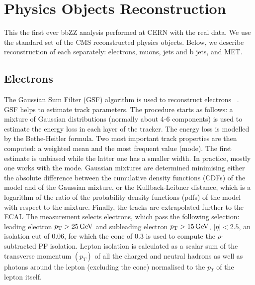 \chapter{Physics Objects Reconstruction}
\label{ch:objects}


This the first ever bbZZ analysis performed at CERN with the real data. We use the standard set of the CMS
reconstructed physics objects. Below, we describe reconstruction of
each separately: electrons, muons, jets and b jets, and MET.



\section{Electrons\label{sec:electrons}}
The Gaussian Sum Filter (GSF) algorithm is used to reconstruct
electrons ~\cite{Khachatryan:2015hwa}. GSF helps to estimate track parameters. The procedure starts as follows: a mixture of Gaussian distributions (normally about 4-6 components) \cite{GSF} is used to estimate the energy loss in each layer of the tracker. The energy loss is modelled by the Bethe-Heitler formula. Two most important track properties are then computed: a weighted mean and the most frequent value (mode). The first estimate is unbiased while the latter one has a smaller width. In practice, mostly one works with the mode. Gaussian mixtures are determined minimising either the absolute difference between the cumulative density functions (CDFs) of the model and of the Gaussian mixture, or the Kullback-Leibner distance, which is a logarithm of the ratio of the probability density functions (pdfs) of the model with respect to the mixture. Finally, the tracks are extrapolated further to the ECAL The measurement selects electrons, which pass the following selection: leading electron $p_{\mathrm{T}}>25\,\text{Ge\hspace{-.08em}V}$ and subleading electron 
$p_{\mathrm{T}}>15\,\text{Ge\hspace{-.08em}V}$, $|\eta|<2.5$, 
an isolation cut of 0.06, for which the cone
of $0.3$ is used to compute the $\rho$-subtracted PF
isolation. Lepton isolation is calculated as a scalar sum of
the transverse momentum $(p_{T})$ of all the charged and
neutral hadrons as well as photons around the lepton
(excluding the cone) normalised to the $p_{T}$ of the lepton
itself. 

        

